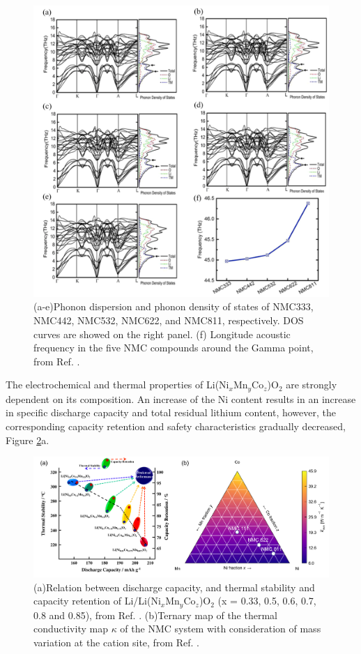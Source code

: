 \documentclass[journal=jacsat,manuscript=article]{achemso}
\begin{document}
\begin{figure}[]
  \centering
    \includegraphics[width=15cm]{Figures/P_phonon.png}
    \caption{(a-e)Phonon dispersion and phonon density of states of NMC333, NMC442, NMC532, NMC622, and NMC811, respectively. DOS curves are showed on the right panel. (f) Longitude acoustic frequency in the five NMC compounds around the Gamma point, from Ref. .}
  \label{figure_phonon}
\end{figure}

The electrochemical and thermal properties of Li(Ni$_x$Mn$_y$Co$_z$)O$_2$ are strongly dependent on its composition. An increase of the Ni content results in an increase in speciﬁc discharge capacity and total residual lithium content, however, the corresponding capacity retention and safety characteristics gradually decreased, Figure \ref{figure_thermal}a. \cite{noh2013comparison} 

\begin{figure}[]
  \centering
    \includegraphics[width=16cm]{Figures/P_thermal.png}
    \caption{(a)Relation between discharge capacity, and thermal stability and capacity retention of Li/Li(Ni$_x$Mn$_y$Co$_z$)O$_2$ (x = 0.33, 0.5, 0.6, 0.7, 0.8 and 0.85), from Ref. . (b)Ternary map of the thermal conductivity map $\kappa$ of the NMC system with consideration of mass variation at the cation site, from Ref. .}
  \label{figure_thermal}
\end{figure}
\end{document}
